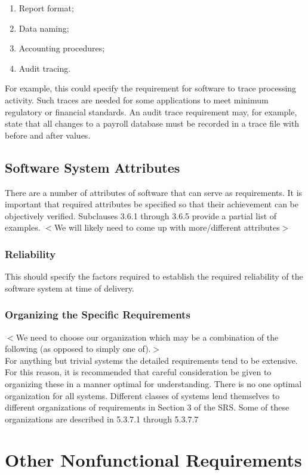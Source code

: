 \documentclass[draftclsnofoot,onecolumn,10pt]{IEEEtran}
\begin{document}
\begin{enumerate}
	\item Report format;
	\item Data naming;
	\item Accounting procedures;
	\item Audit tracing.
\end{enumerate}

For example, this could specify the requirement for software to trace processing
activity. Such traces are needed for some applications to meet minimum
regulatory or financial standards. An audit trace requirement may, for example,
state that all changes to a payroll database must be recorded in a trace file
with before and after values.

\subsection{Software System Attributes}
There are a number of attributes of software that can serve as requirements. It
is important that required attributes be specified so that their achievement can
be objectively verified. Subclauses 3.6.1 through 3.6.5 provide a partial list
of examples.
$<$We will likely need to come up with more/different attributes$>$

\subsubsection{Reliability}
This should specify the factors required to establish the required reliability
of the software system at time of delivery.

\subsubsection{Organizing the Specific Requirements}
$<$We need to choose our organization which may be a combination of the
following (as opposed to simply one of).$>$\\
For anything but trivial systems the detailed requirements tend to be extensive.
For this reason, it is recommended that careful consideration be given to
organizing these in a manner optimal for understanding. There is no one optimal
organization for all systems. Different classes of systems lend themselves to
different organizations of requirements in Section 3 of the SRS. Some of these
organizations are described in 5.3.7.1 through 5.3.7.7


\section{Other Nonfunctional Requirements}
\end{document}
